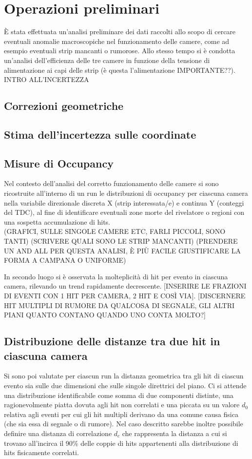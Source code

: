 \documentclass[8pt]{extarticle}
\begin{document}
\section{Operazioni preliminari}
È stata effettuata un’analisi preliminare dei dati raccolti allo scopo di cercare eventuali anomalie macroscopiche nel funzionamento delle camere, come ad esempio eventuali strip mancanti o rumorose. Allo stesso tempo si è condotta un'analisi dell'efficienza delle tre camere in funzione della tensione di alimentazione ai capi delle strip (è questa l'alimentazione IMPORTANTE??). INTRO ALL'INCERTEZZA
\subsection{Correzioni geometriche}
\subsection{Stima dell'incertezza sulle coordinate}

\subsection{Misure di Occupancy}
Nel contesto dell'analisi del  corretto funzionamento delle camere si sono ricostruite all'interno di un run le distribuzioni di occupancy per ciascuna camera nella variabile direzionale discreta X (strip interessata/e) e continua Y (conteggi del TDC), al fine di identificare eventuali zone morte del rivelatore o regioni con una sospetta accumulazione di hits.\\
(GRAFICI, SULLE SINGOLE CAMERE ETC, FARLI PICCOLI, SONO TANTI)
(SCRIVERE QUALI SONO LE STRIP MANCANTI)
(PRENDERE UN AND ALL PER QUESTA ANALISI, È PIÙ FACILE GIUSTIFICARE LA FORMA A CAMPANA O UNIFORME)

In secondo luogo si è osservata la molteplicità di hit per evento in ciascuna camera, rilevando un trend rapidamente decrescente. [INSERIRE LE FRAZIONI DI EVENTI CON 1 HIT PER CAMERA, 2 HIT E COSÌ VIA]. 
[DISCERNERE HIT MULTIPLI DI RUMORE DA QUALCOSA DI SEGNALE, GLI ALTRI PIANI QUANTO CONTANO QUANDO UNO CONTA MOLTO?]

\subsection{Distribuzione delle distanze tra due hit in ciascuna camera}
Si sono poi valutate per ciascun run la distanza geometrica tra gli hit di ciascun evento  sia sulle due dimensioni che sulle singole direttrici del piano. Ci si attende una distribuzione identificabile come somma di due componenti distinte, una ragionevolmente piatta dovuta agli hit non correlati e una piccata su un valore $d_0$ relativa agli eventi per cui gli hit multipli derivano da una comune causa fisica (che sia essa di segnale o di rumore). 
Nel caso descritto sarebbe inoltre possibile definire una distanza di correlazione $d_c$ che rappresenta la distanza a cui si trovano all'incirca il 90\% delle coppie di hits appartenenti alla distribuzione di hits fisicamente correlati.
\end{document}
